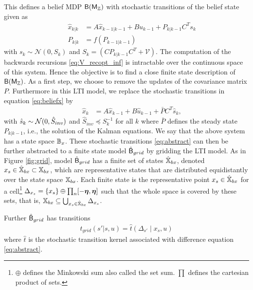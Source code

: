 \documentclass{ifacconf}
\newcommand{\new}[1]{{\color{blue}#1}}
\begin{document}
This defines a belief MDP $\mathsf{B}{(\mathsf{M}_{{\mathbb{Z}}})}$ with stochastic transitions of the belief state given as 
\begin{align}
	&&\hat x_{k|k}&=A\hat x_{k-1|k-1}+Bu_{k-1}+P_{k|k-1}C^Ts_k\label{eq:beliefx}\\
	&&P_{k|k}&=f(P_{k-1|k-1})\label{eq:beliefP}
\end{align}
with $s_k\sim \mathcal N (0, S_k )$ and  $S_k=\left(CP_{k|k-1}C^T+\mathcal V\right)$. 
\new{The computation of the backwards recursions \eqref{eq:V_recopt_inf} is intractable over the continuous space of this system. Hence the objective is to find a close finite state description of $\mathsf{B}{(\mathsf{M}_{{\mathbb{Z}}})}$.  As a first step, we choose to remove the updates of the covariance matrix $P$.  }
Furthermore in this LTI model,  we replace the stochastic transitions  in equation \eqref{eq:beliefx} by
\begin{align}  
		&&\hat x_k &=A\hat x_{k-1} +B\hat u_{k-1} + \bar P  C^T  \hat{s}_k,\label{eq:abstract} 
\end{align}
with $ \hat{s}_k\sim \mathcal{N} (0,\hat{S}_{inv})$ and $\hat{S}_{inv}\preceq S_k^{-1}$ for all $k$ \new{where $\bar P$ defines the steady state $P_{k|k-1}$, i.e., the solution of the Kalman equations. We say that the above system has a state space $\mathbb{B}_{x}$.}
These stochastic transitions \eqref{eq:abstract} can then be further abstracted to a finite state model $\hat{\mathsf{B}}_{grid}$ by gridding the LTI model.
As in Figure \ref{fig:grid}, model  $\hat{\mathsf{B}}_{grid}$ has a finite set of states $ \hat {{\mathbb{X}}}_{bx}$, denoted $x_s\in \hat {{\mathbb{X}}}_{bx}\subset  {{\mathbb{X}}}_{bx}$,  which are representative states that are distributed  equidistantly over the state space $  {{\mathbb{X}}}_{bx}$.   
Each finite state is the representative point $x_s\in  \hat {{\mathbb{X}}}_{bx}$ for a cell\footnote{$\oplus$ defines the  Minkowski sum also called the set sum. $\prod$ defines the cartesian product of sets.}
 $\Delta_{x_s}=\{x_s\} \oplus \prod_n [-{\boldsymbol{\eta}}, {\boldsymbol{\eta}}]$ such that the whole space is covered by these sets, that is, ${{\mathbb{X}}}_{bx} \subseteq \bigcup_{x_s\in \hat {{\mathbb{X}}}_{bx}}\Delta_{x_s}$.


Further $\hat{\mathsf{B}}_{grid}$  has transitions 
\begin{align}\label{eq:tgrid}
t_{grid}(s'|s,u)=\hat t \left(\Delta_{s'}\mid x_s, u\right)
\end{align}where $\hat t$ is the stochastic transition kernel associated with difference equation \eqref{eq:abstract}.
\end{document}
